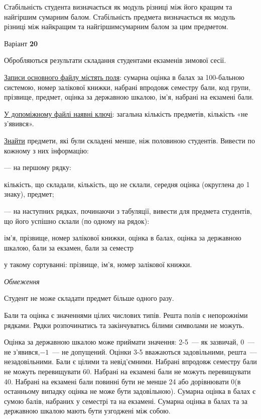 \documentclass[11pt, ukrainian]{article}
\begin{document}
Стабільність студента визначається як модуль різниці між його кращим та найгіршим сумарним балом.
Стабільність предмета визначається як модуль різниці між найкращим та найгіршимсумарним балом за цим предметом.




\par
\newpage
{\center Варіант  \No \textbf { 20 }\par}
\bigskip
Обробляються результати складання студентами екзаменів зимової сесії.

\underline{Записи основного файлу містять поля}: сумарна оцінка в балах за 100-бальною системою, номер залікової книжки, набрані впродовж семестру бали, код групи, прізвище, предмет, оцінка за державною шкалою, ім’я, набрані на екзамені бали.

\underline{У допоміжному файлі наявні ключі}: загальна кількість предметів, кількість «не з’явився».

\underline{Знайти} предмети, які були складені менше, ніж половиною студентів. Вивести по кожному з них інформацію:\par
{\noindent}--- на першому рядку:\par
кількість, що складали, кількість, що не склали, середня оцінка (округлена до 1 знаку), предмет;

{\noindent}--- на наступних рядках, починаючи з табуляції, вивести для предмета студентів, що його успішно склали (по одному на рядок):\par
ім’я, прізвище, номер залікової книжки, оцінка в балах, оцінка за державною шкалою, бали за екзамен, бали за семестр

{\noindent}у такому сортуванні: прізвище, ім’я, номер залікової книжки.


\bigskip\textit{Обмеження}

Студент не може складати предмет більше одного разу.

Бали та оцінка є значеннями цілих числових типів. Решта полів є непорожніми рядками.
Рядки розпочинатись та закінчуватись білими символами не можуть.

Оцінка за державною шкалою може приймати значення: 2-5~--- як зазвичай, 0~--- не з’явився,$-1$~--- не допущений. 
Оцінки 3-5 вважаються задовільними, решта~--- незадовільними. 
Бали є цілими та невід’ємними.
Набрані впродовж семестру бали не можуть перевищувати 60. 
Набрані на екзамені бали не можуть перевищувати 40. 
Набрані на екзамені бали повинні бути не менше 24 або дорівнювати 0(в останньому випадку оцінка не може бути задовільною). 
Сумарна оцінка в балах є сумою балів, набраних у семестрі та на екзамені.
Сумарна оцінка в балах та за державною шкалою мають бути узгоджені між собою.
\end{document}
